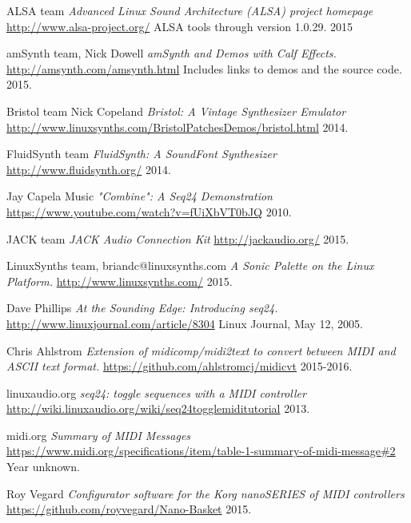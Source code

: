\begin{thebibliography}{99}

   ALSA team
   \emph{Advanced Linux Sound Architecture (ALSA) project homepage}
   \url{http://www.alsa-project.org/}
   ALSA tools through version 1.0.29.
   2015

   amSynth team, Nick Dowell
   \emph{amSynth and Demos with Calf Effects.}
   \url{http://amsynth.com/amsynth.html}
   Includes links to demos and the source code.
   2015.

   Bristol team Nick Copeland
   \emph{Bristol: A Vintage Synthesizer Emulator}
   \url{http://www.linuxsynths.com/BristolPatchesDemos/bristol.html}
   2014.

   FluidSynth team
   \emph{FluidSynth: A SoundFont Synthesizer}
   \url{http://www.fluidsynth.org/}
   2014.

   Jay Capela Music
   \emph{"Combine": A Seq24 Demonstration}
   \url{https://www.youtube.com/watch?v=fUiXbVT0bJQ}
   2010.

   JACK team
   \emph{JACK Audio Connection Kit}
   \url{http://jackaudio.org/}
   2015.

   LinuxSynths team, briandc@linuxsynths.com
   \emph{A Sonic Palette on the Linux Platform.}
   \url{http://www.linuxsynths.com/}
   2015.

   Dave Phillips
   \emph{At the Sounding Edge: Introducing seq24.}
   \url{http://www.linuxjournal.com/article/8304}
   Linux Journal, May 12, 2005.

   Chris Ahlstrom
   \emph{Extension of midicomp/midi2text to convert between MIDI and ASCII
      text format.}
   \url{https://github.com/ahlstromcj/midicvt}
   2015-2016.

   linuxaudio.org
   \emph{seq24: toggle sequences with a MIDI controller}
   \url{http://wiki.linuxaudio.org/wiki/seq24togglemiditutorial}
   2013.

   midi.org
   \emph{Summary of MIDI Messages}
   \url{https://www.midi.org/specifications/item/table-1-summary-of-midi-message#2}
   Year unknown.

   Roy Vegard
   \emph{Configurator software for the Korg nanoSERIES of MIDI controllers}
   \url{https://github.com/royvegard/Nano-Basket}
   2015.


\end{thebibliography}
